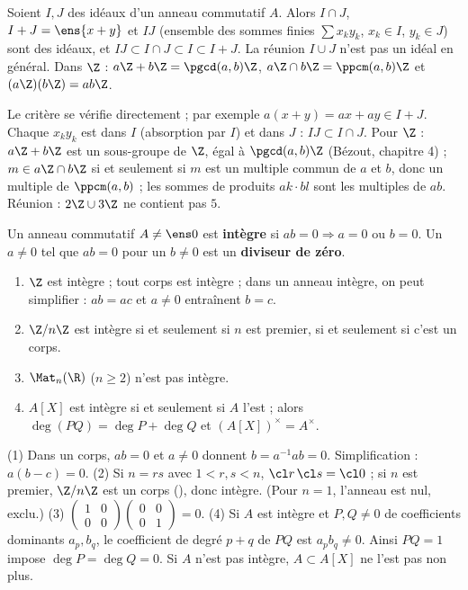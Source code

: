 \begin{proposition}\label{prop-op-ideaux}
Soient $I,J$ des idéaux d'un anneau commutatif $A$. Alors $I\cap J$, $I+J=\ens{x+y}$ et $IJ$ (ensemble des sommes finies $\sum x_ky_k$, $x_k\in I$, $y_k\in J$) sont des idéaux, et $IJ\subset I\cap J\subset I\subset I+J$. La réunion $I\cup J$ n'est pas un idéal en général. Dans $\Z$ : $a\Z+b\Z=\pgcd(a,b)\Z$, $a\Z\cap b\Z=\ppcm(a,b)\Z$ et $(a\Z)(b\Z)=ab\Z$.
\end{proposition}
\begin{preuve}
Le critère se vérifie directement ; par exemple $a(x+y)=ax+ay\in I+J$. Chaque $x_ky_k$ est dans $I$ (absorption par $I$) et dans $J$ : $IJ\subset I\cap J$. Pour $\Z$ : $a\Z+b\Z$ est un sous-groupe de $\Z$, égal à $\pgcd(a,b)\Z$ (Bézout, chapitre 4) ; $m\in a\Z\cap b\Z$ si et seulement si $m$ est un multiple commun de $a$ et $b$, donc un multiple de $\ppcm(a,b)$ ; les sommes de produits $ak\cdot bl$ sont les multiples de $ab$. Réunion : $2\Z\cup3\Z$ ne contient pas $5$.
\end{preuve}
\begin{definition}
Un anneau commutatif $A\neq\ens0$ est \textbf{intègre} si $ab=0\Rightarrow a=0$ ou $b=0$. Un $a\neq0$ tel que $ab=0$ pour un $b\neq0$ est un \textbf{diviseur de zéro}.
\end{definition}
\begin{proposition}\label{prop-integre}
\begin{enumerate}
\item $\Z$ est intègre ; tout corps est intègre ; dans un anneau intègre, on peut simplifier : $ab=ac$ et $a\neq0$ entraînent $b=c$.
\item $\Z/n\Z$ est intègre si et seulement si $n$ est premier, si et seulement si c'est un corps.
\item $\Mat_n(\R)$ ($n\ge2$) n'est pas intègre.
\item $A[X]$ est intègre si et seulement si $A$ l'est ; alors $\deg(PQ)=\deg P+\deg Q$ et $(A[X])^\times=A^\times$.
\end{enumerate}
\end{proposition}
\begin{preuve}
(1) Dans un corps, $ab=0$ et $a\neq0$ donnent $b=a^{-1}ab=0$. Simplification : $a(b-c)=0$. (2) Si $n=rs$ avec $1<r,s<n$, $\cl r\,\cl s=\cl0$ ; si $n$ est premier, $\Z/n\Z$ est un corps (), donc intègre. (Pour $n=1$, l'anneau est nul, exclu.) (3) $\begin{pmatrix}1&0\\0&0\end{pmatrix}\begin{pmatrix}0&0\\0&1\end{pmatrix}=0$. (4) Si $A$ est intègre et $P,Q\neq0$ de coefficients dominants $a_p,b_q$, le coefficient de degré $p+q$ de $PQ$ est $a_pb_q\neq0$. Ainsi $PQ=1$ impose $\deg P=\deg Q=0$. Si $A$ n'est pas intègre, $A\subset A[X]$ ne l'est pas non plus.
\end{preuve}
